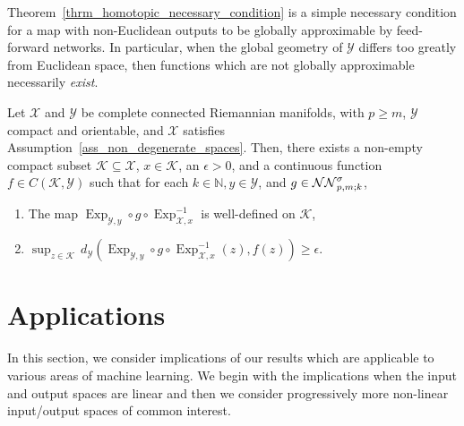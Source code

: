 \documentclass[anon,12pt]{colt2021} %
\newcommand{\xxx}{\mathcal{X}}
\newcommand{\yyy}{\mathcal{Y}}
\newcommand{\nn}{{\mathbb{N}}}
\newcommand{\kkk}{{\mathscr{K}}}
\begin{document}
Theorem~\ref{thrm_homotopic_necessary_condition} is a simple necessary condition for a map with non-Euclidean outputs to be globally approximable by feed-forward networks.  In particular, when the global geometry of $\yyy$ differs too greatly from Euclidean space, then functions which are not globally approximable necessarily \textit{exist}.  
\begin{theorem}\label{thrm_negative_motiation}
Let $\xxx$ and $\yyy$ be complete connected Riemannian manifolds, with $p\geq m$, $\yyy$ compact and orientable, and $\xxx$ satisfies Assumption~\ref{ass_non_degenerate_spaces}.  Then, there exists a non-empty compact subset $\kkk\subseteq \xxx$, $x \in \kkk$, an $\epsilon>0$, and a continuous function 
$f\in C(\kkk,\yyy)$ such that
for each $k \in \nn,y \in \yyy$, and $g \in \NN[p,m;k]$, 
\begin{enumerate}[label=(i),leftmargin=1.75em]
    \item The map $\operatorname{Exp}_{\yyy,y}\circ g\circ \operatorname{Exp}_{\xxx,x}^{-1}$ is well-defined on $\kkk$,
\item $
\sup_{z \in \kkk}\,
d_{\yyy}\left(
\operatorname{Exp}_{\yyy,y}\circ g \circ \operatorname{Exp}_{\xxx,x}^{-1}(z),f(z)
\right)\geq \epsilon
.
$
\end{enumerate}
\end{theorem}
\section{Applications}\label{s_Applications}
In this section, we consider implications of our results which are applicable to various areas of machine learning.  We begin with the implications when the input and output spaces are linear and then we consider progressively more non-linear input/output spaces of common interest.  
\end{document}
